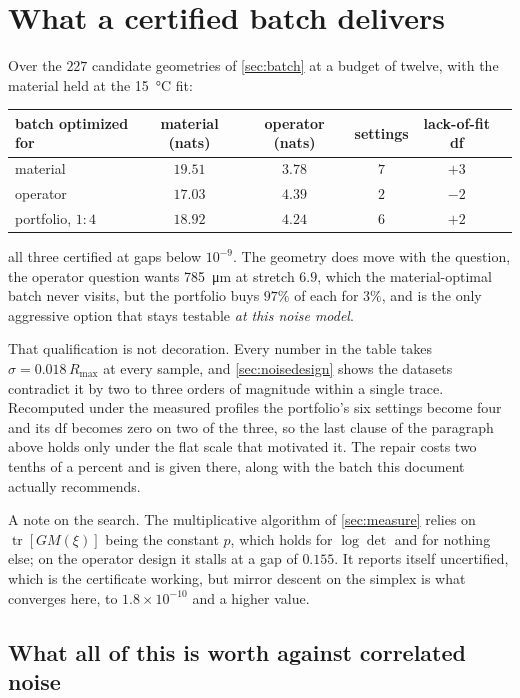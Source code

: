 \documentclass[10pt]{article}
\begin{document}
\section{What a certified batch delivers}

Over the $227$ candidate geometries of \cref{sec:batch} at a budget of twelve, with the material
held at the \SI{15}{\celsius} fit:

\begin{center}
\begin{tabular}{lccccc}
\toprule
batch optimized for & material (nats) & operator (nats) & settings & lack-of-fit df \\
\midrule
material & $\mathbf{19.51}$ & $3.78$ & $7$ & $+3$ \\
operator & $17.03$ & $\mathbf{4.39}$ & $2$ & $-2$ \\
portfolio, $1\!:\!4$ & $18.92$ & $4.24$ & $6$ & $+2$ \\
\bottomrule
\end{tabular}
\end{center}

\noindent all three certified at gaps below $10^{-9}$. The geometry does move with the question, the operator question wants \SI{785}{\micro\metre} at stretch $6.9$, which the
material-optimal batch never visits, but the portfolio buys $97\%$ of each for $3\%$, and is
the only aggressive option that stays testable \emph{at this noise model}.

That qualification is not decoration. Every number in the table takes
$\sigma = 0.018\,R_{\max}$ at every sample, and \cref{sec:noisedesign} shows the datasets
contradict it by two to three orders of magnitude within a single trace. Recomputed under the
measured profiles the portfolio's six settings become four and its $\mathrm{df}$ becomes zero on
two of the three, so the last clause of the paragraph above holds only under the flat scale that
motivated it. The repair costs two tenths of a percent and is given there, along with the batch
this document actually recommends.

A note on the search. The multiplicative algorithm of \cref{sec:measure} relies on
$\operatorname{tr}[GM(\xi)]$ being the constant $p$, which holds for $\log\det$ and for nothing
else; on the operator design it stalls at a gap of $0.155$. It reports itself uncertified, which
is the certificate working, but mirror descent on the simplex is what converges here, to
$1.8\times10^{-10}$ and a higher value.

\subsection*{What all of this is worth against correlated noise}
\end{document}
